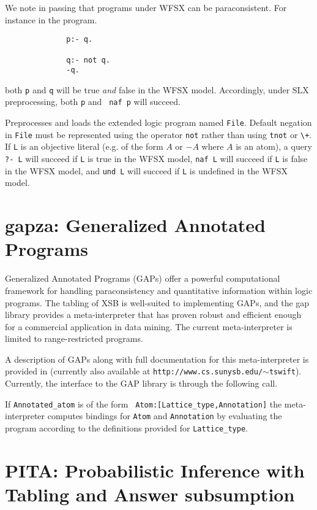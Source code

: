 We note in passing that programs under WFSX can be paraconsistent.
For instance in the program.

\begin{verbatim}
              p:- q.

              q:- not q.
              -q.
\end{verbatim}

both {\tt p} and {\tt q} will be true {\em and} false in the WFSX
model.  Accordingly, under SLX preprocessing, both {\tt p} and {\tt
naf p} will succeed.

\begin{description}
Preprocesses and loads the extended logic program named {\tt File}.
Default negation in {\tt File} must be represented using the operator
{\tt not} rather than using {\tt tnot} or \verb|\+|.  If {\tt L} is an
objective literal (e.g. of the form $A$ or $-A$ where $A$ is an atom),
a query {\tt ?- L} will succeed if {\tt L} is true in the WFSX model,
{\tt naf L} will succeed if {\tt L} is false in the WFSX model, and
{\tt und L} will succeed if {\tt L} is undefined in the WFSX model.
\end{description}


\section{gapza: Generalized Annotated Programs}
\label{library_utilities:gap} 

Generalized Annotated Programs (GAPs) \cite{KiSu92} offer a powerful
computational framework for handling paraconsistency and quantitative
information within logic programs.  The tabling of XSB is well-suited
to implementing GAPs, and the gap library provides a meta-interpreter
that has proven robust and efficient enough for a commercial
application in data mining.  The current meta-interpreter is limited
to range-restricted programs.

A description of GAPs along with full documentation for this
meta-interpreter is provided in \cite{Swif99a} (currently also
available at {\tt http://www.cs.sunysb.edu/$\sim$tswift}).  Currently, the
interface to the GAP library is through the following call.

\begin{description}
%
If {\tt Annotated\_atom} is of the form {\tt
Atom:[Lattice\_type,Annotation]} the meta-interpreter computes bindings
for {\tt Atom} and {\tt Annotation} by evaluating the program
according to the definitions provided for {\tt Lattice\_type}.
\end{description}


\section{ PITA: Probabilistic  Inference with Tabling and Answer subsumption }
\label{package:pita} 


